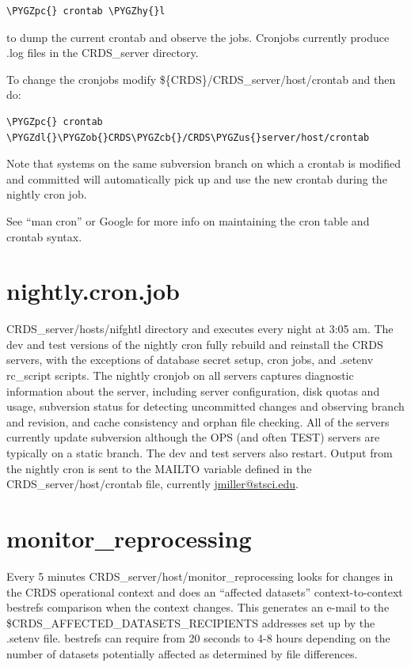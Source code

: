 \documentclass[letterpaper,10pt,english]{sphinxmanual}
\def\PYGZus{\char`\_}
\def\PYGZob{\char`\{}
\def\PYGZcb{\char`\}}
\def\PYGZpc{\char`\%}
\def\PYGZdl{\char`\$}
\def\PYGZhy{\char`\-}
\begin{document}
\begin{Verbatim}[commandchars=\\\{\}]
\PYGZpc{} crontab \PYGZhy{}l
\end{Verbatim}

to dump the current crontab and observe the jobs.   Cronjobs currently produce .log files in the CRDS\_server directory.

To change the cronjobs modify \$\{CRDS\}/CRDS\_server/host/crontab and then do:

\begin{Verbatim}[commandchars=\\\{\}]
\PYGZpc{} crontab \PYGZdl{}\PYGZob{}CRDS\PYGZcb{}/CRDS\PYGZus{}server/host/crontab
\end{Verbatim}

Note that systems on the same subversion branch on which a crontab is modified and committed will automatically pick
up and use the new crontab during the nightly cron job.

See ``man cron'' or Google for more info on maintaining the cron table and crontab syntax.


\section{nightly.cron.job}
\label{server_guide:nightly-cron-job}
CRDS\_server/hosts/nifghtl directory and executes every night at 3:05 am.  The dev and test versions
of the nightly cron fully rebuild and reinstall the CRDS servers,  with the exceptions of database secret setup,
cron jobs, and .setenv rc\_script scripts.   The nightly cronjob on all servers captures diagnostic information about
the server,  including server configuration, disk quotas and usage, subversion status for detecting uncommitted
changes and observing branch and revision, and cache consistency and orphan file checking.   All of the servers
currently update subversion although the OPS (and often TEST) servers are typically on a static branch.   The dev
and test servers also restart.  Output from the nightly cron is sent to the MAILTO variable defined in the
CRDS\_server/host/crontab file,  currently \href{mailto:jmiller@stsci.edu}{jmiller@stsci.edu}.


\section{monitor\_reprocessing}
\label{server_guide:monitor-reprocessing}
Every 5 minutes CRDS\_server/host/monitor\_reprocessing looks for changes in the CRDS operational context and
does an ``affected datasets'' context-to-context bestrefs comparison when the context changes.   This generates
an e-mail to the \$CRDS\_AFFECTED\_DATASETS\_RECIPIENTS addresses set up by the .setenv file.   bestrefs can require
from 20 seconds to 4-8 hours depending on the number of datasets potentially affected as determined by file
differences.
\end{document}
